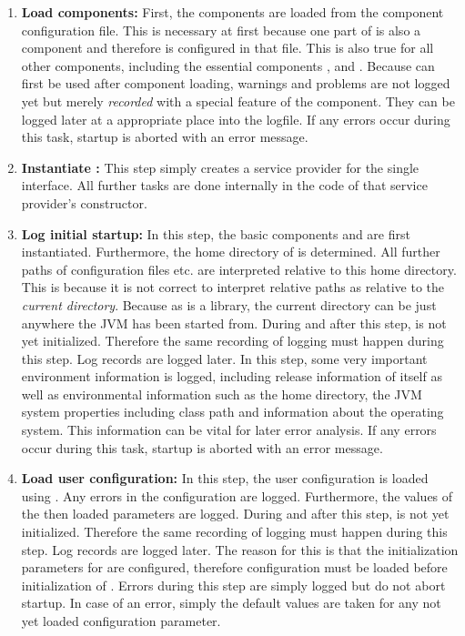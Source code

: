 \begin{enumerate}
	\item \textbf{Load components:} First, the components are loaded from the component configuration file. This is necessary at first because one part of \COMPcontext{} is also a \ComponentRegistry{} component and therefore is configured in that file. This is also true for all other components, including the essential components \COMPlogging{}, \COMPconfiguriation{} and \COMPextensionManagement{}. Because \COMPlogging{} can first be used after component loading, warnings and problems are not logged yet but merely \emph{recorded} with a special feature of the \COMPlogging{} component. They can be logged later at a appropriate place into the logfile. If any errors occur during this task, \LibName{} startup is aborted with an error message.
	\item \textbf{Instantiate \COMPcontext{}:} This step simply creates a service provider for the single \COMPcontext{} interface. All further tasks are done internally in the code of that service provider's constructor.
	\item \textbf{Log initial startup:} In this step, the basic components \COMPconfiguration{} and \COMPlogging{} are first instantiated. Furthermore, the home directory of \LibName{} is determined. All further paths of configuration files etc. are interpreted relative to this home directory. This is because it is not correct to interpret relative paths as relative to the \emph{current directory}. Because as \LibName{} is a library, the current directory can be just anywhere the JVM has been started from. During and after this step, \COMPlogging{} is not yet initialized. Therefore the same recording of logging must happen during this step. Log records are logged later. In this step, some very important environment information is logged, including release information of \LibName{} itself as well as environmental information such as the \LibName{} home directory, the JVM system properties including class path and information about the operating system. This information can be vital for later error analysis. If any errors occur during this task, \LibName{} startup is aborted with an error message.
	\item \textbf{Load user configuration:} In this step, the user configuration is loaded using \COMPconfiguration{}. Any errors in the configuration are logged. Furthermore, the values of the then loaded parameters are logged. During and after this step, \COMPlogging{} is not yet initialized. Therefore the same recording of logging must happen during this step. Log records are logged later. The reason for this is that the initialization parameters for \COMPlogging{} are configured, therefore configuration must be loaded before initialization of \COMPlogging{}. Errors during this step are simply logged but do not abort \LibName{} startup. In case of an error, simply the default values are taken for any not yet loaded configuration parameter.

\end{enumerate}

